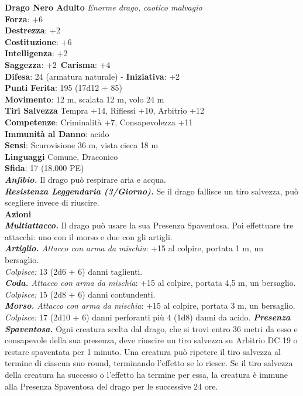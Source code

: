 \begin{multicols}{2}
\medskip\textbf{Drago Nero Adulto}
\emph{Enorme drago, caotico malvagio}\\
\textbf{Forza}: +6\\
\textbf{Destrezza}: +2\\
\textbf{Costituzione}: +6\\
\textbf{Intelligenza}: +2\\
\textbf{Saggezza}: +2\
\textbf{Carisma}: +4\\
\textbf{Difesa}: 24 (armatura naturale) - \textbf{Iniziativa}: +2\\
\textbf{Punti Ferita}: 195 (17d12 + 85)\\
\textbf{Movimento}: 12 m, scalata 12 m, volo 24 m\\
\textbf{Tiri Salvezza} Tempra +14, Riflessi +10, Arbitrio +12\\
\textbf{Competenze}: Criminalità +7, Consapevolezza +11\\
\textbf{Immunità al Danno}: acido\\
\textbf{Sensi}: Scurovisione 36 m, vista cieca 18 m\\
\textbf{Linguaggi} Comune, Draconico\\
\textbf{Sfida}: 17 (18.000 PE)\smallskip\\
\emph{\textbf{Anfibio.}} Il drago può respirare aria e acqua.\\
\emph{\textbf{Resistenza Leggendaria (3/Giorno).}} Se il drago fallisce un tiro salvezza, può scegliere invece di riuscire.\\
\smallskip\textbf{Azioni}\\
\emph{\textbf{Multiattacco.}} Il drago può usare la sua Presenza Spaventosa. Poi effettuare tre attacchi: uno con il morso e due con gli artigli.\\
\emph{\textbf{Artiglio.} Attacco con arma da mischia}: +15 al colpire, portata 1 m, un bersaglio.\\
\emph{Colpisce:} 13 (2d6 + 6) danni taglienti.\\
\emph{\textbf{Coda.} Attacco con arma da mischia}: +15 al colpire, portata 4,5 m, un bersaglio.\\
\emph{Colpisce:} 15 (2d8 + 6) danni contundenti. \\
\emph{\textbf{Morso.} Attacco con arma da mischia}: +15 al colpire, portata 3 m, un bersaglio.\\
\emph{Colpisce:} 17 (2d10 + 6) danni perforanti più 4 (1d8) danni da acido.
\emph{\textbf{Presenza Spaventosa.}} Ogni creatura scelta dal drago, che si trovi entro 36 metri da esso e consapevole della sua presenza, deve riuscire un tiro salvezza su Arbitrio DC  19 o restare spaventata per 1 minuto. Una creatura può ripetere il tiro salvezza al termine di ciascun suo round, terminando l'effetto se lo riesce. Se il tiro salvezza della creatura ha successo o l'effetto ha termine per essa, la creatura è immune alla Presenza Spaventosa del drago per le successive 24 ore.\\

\end{multicols}
